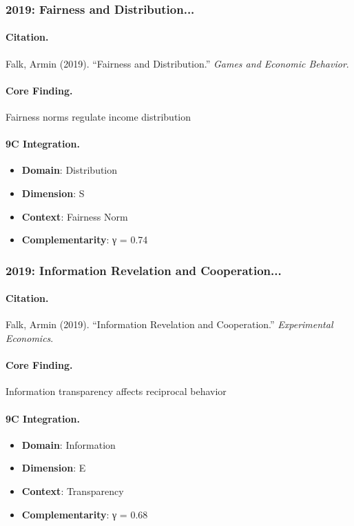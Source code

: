 \subsubsection{2019: Fairness and Distribution...}

\paragraph{Citation.}
Falk, Armin (2019). ``Fairness and Distribution.''
\textit{Games and Economic Behavior}.

\paragraph{Core Finding.}
Fairness norms regulate income distribution

\paragraph{9C Integration.}
\begin{itemize}[nosep]
  \item \textbf{Domain}: Distribution
  \item \textbf{Dimension}: S
  \item \textbf{Context}: Fairness Norm
  \item \textbf{Complementarity}: γ = 0.74
\end{itemize}


\subsubsection{2019: Information Revelation and Cooperation...}

\paragraph{Citation.}
Falk, Armin (2019). ``Information Revelation and Cooperation.''
\textit{Experimental Economics}.

\paragraph{Core Finding.}
Information transparency affects reciprocal behavior

\paragraph{9C Integration.}
\begin{itemize}[nosep]
  \item \textbf{Domain}: Information
  \item \textbf{Dimension}: E
  \item \textbf{Context}: Transparency
  \item \textbf{Complementarity}: γ = 0.68
\end{itemize}


